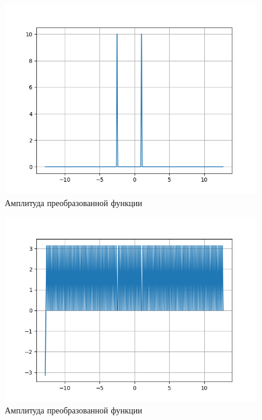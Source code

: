 {	\begin{figure}[H]
       \centering
            \includegraphics[width=\textwidth,height=\textheight,keepaspectratio]{Amplitude_calc.png}
            \caption{Амплитуда преобразованной функции}
    \end{figure}
    
    \begin{figure}[H]
       \centering
            \includegraphics[width=\textwidth,height=\textheight,keepaspectratio]{Phase_calc.png}
            \caption{Амплитуда преобразованной функции}
    \end{figure}
        
}
